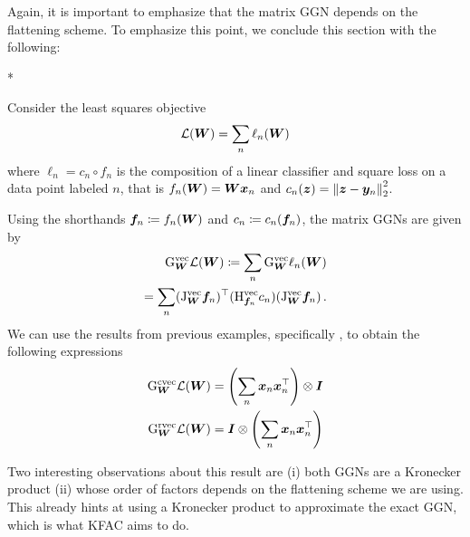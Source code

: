 Again, it is important to emphasize that the matrix GGN depends on the flattening scheme.
To emphasize this point, we conclude this section with the following:

\switchcolumn[1]*
\switchcolumn[0]

\begin{example}
  Consider the least squares objective
  \begin{align*}
    {\mathcal{L}}({\bm{W}}) = \sum_n \ell_n({\bm{W}})
  \end{align*}
  where $\ell_n = c_n \circ f_n$ is the composition of a linear classifier and square loss
  on a data point labeled $n$, that is
  $f_n({\bm{W}}) = {\bm{W}} {\bm{x}}_n$ and $c_n({\bm{z}}) = \left\lVert {\bm{z}} - {\bm{y}}_n \right\rVert^2_2$.

  Using the shorthands ${\bm{f}}_n \coloneq f_n({\bm{W}})$ and $c_n \coloneq c_n({\bm{f}}_n)$, the matrix GGNs are given by
  \begin{align*}
    \mathrm{G}_{{\bm{W}}}^{\operatorname{vec}}{\mathcal{L}}({\bm{W}})
    \coloneq
    \sum_n
    \mathrm{G}_{{\bm{W}}}^{\operatorname{vec}} \ell_n({\bm{W}})
    \\
    =
    \sum_n
    (\mathrm{J}^{\operatorname{vec}}_{{\bm{W}}} {\bm{f}}_n)^{\top}
    (\mathrm{H}^{\operatorname{vec}}_{{\bm{f}}_n} c_n)
    (\mathrm{J}^{\operatorname{vec}}_{{\bm{W}}} {\bm{f}}_n)\,.
  \end{align*}
  We can use the results from previous examples, specifically , to obtain the following expressions
  \begin{align*}
    \mathrm{G}_{{\bm{W}}}^{\operatorname{cvec}}{\mathcal{L}}({\bm{W}})
    &=
      \left(
      \sum_n {\bm{x}}_n {\bm{x}}_n^{\top}
      \right)
      \otimes {\bm{I}}
    \\
    \mathrm{G}_{{\bm{W}}}^{\operatorname{rvec}}{\mathcal{L}}({\bm{W}})
    &=
      {\bm{I}}
      \otimes
      \left(
      \sum_n {\bm{x}}_n {\bm{x}}_n^{\top}
      \right)
  \end{align*}
\end{example}
Two interesting observations about this result are (i) both GGNs are a Kronecker product (ii) whose order of factors depends on the flattening scheme we are using.
This already hints at using a Kronecker product to approximate the exact GGN, which is what KFAC aims to do.


